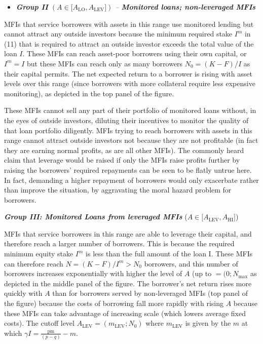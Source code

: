 \documentclass[letterpaper, 12pt]{article}
\begin{document}
\begin{itemize}
\item \emph{\textbf{Group II} $(A \in \lbrack A_{\text{LO}},A_{\text{LEV}}\rbrack)$ -- \textbf{Monitored loans; non-leveraged MFIs}} \\

\end{itemize}

MFIs that service borrowers with assets in this range use monitored
lending but cannot attract any outside investors because the minimum
required stake \(I^{m}\) in (11) that is required to attract an outside
investor exceeds the total value of the loan \(I\). These MFIs can reach
asset-poor borrowers using their own capital, or \(I^{m} = I\) but these
MFIs can reach only as many borrowers \(N_{0} = (K - F)/I\) as their
capital permits. The net expected return to a borrower is rising with
asset levels over this range (since borrowers with more collateral
require less expensive monitoring), as depicted in the top panel of the
figure.

These MFIs cannot sell any part of their portfolio of monitored loans without, in the eyes of outside investors, diluting their incentives to monitor the quality of that loan portfolio diligently. MFIs trying to reach borrowers with assets in this range cannot attract outside investors not because they are not profitable (in fact they are earning
normal profits, as are all other MFIs). The commonly heard claim that leverage would be raised if only the MFIs raise profits further by raising the borrowers' required repayments can be seen to be flatly untrue here. In fact, demanding a higher repayment of borrowers would
only exacerbate rather than improve the situation, by aggravating the moral hazard problem for borrowers.

\emph{\textbf{{Group III: Monitored Loans from leveraged MFIs}}}
(\(A \in \lbrack A_{\text{LEV}},A_{\text{HI}}\rbrack\))

MFIs that service borrowers in this range are able to leverage their
capital, and therefore reach a larger number of borrowers. This is
because the required minimum equity stake \(I^{m}\) is less than the
full amount of the loan \(\text{I.}\) These MFIs can therefore reach
\(N = (K - F)/I^{m} > N_{0}\) borrowers, and this number of borrowers
increases exponentially with higher the level of \(A\) (up to
\(= (0;N_{\max}\) as depicted in the middle panel of the figure. The
borrower's net return rises more quickly with \(A\) than for borrowers
served by non-leveraged MFIs (top panel of the figure) because the costs
of borrowing fall more rapidly with rising \(A\) because these MFIs can
take advantage of increasing scale (which lowers average fixed costs).
The cutoff level \(A_{\text{LEV}} = (m_{\text{LEV}};N_{0})\) where
\(m_{\text{LEV}}\) is given by the \(m\) at which
\(\gamma I = \frac{\text{pm}}{(p - q)} - m\).
\end{document}
